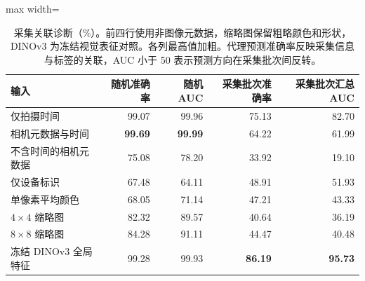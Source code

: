 \begin{table}[htbp]
\centering\small
\caption{采集关联诊断（\%）。前四行使用非图像元数据，缩略图保留粗略颜色和形状，DINOv3 为冻结视觉表征对照。各列最高值加粗。代理预测准确率反映采集信息与标签的关联，AUC 小于 50 表示预测方向在采集批次间反转。}
\label{tab:probes}
\begin{adjustbox}{max width=\linewidth}
\begin{tabular}{lrrrr}
\toprule
输入 & 随机准确率 & 随机 AUC & 采集批次准确率 & 采集批次汇总 AUC\\
\midrule
仅拍摄时间 & 99.07 & 99.96 & 75.13 & 82.70\\
相机元数据与时间 & \textbf{99.69} & \textbf{99.99} & 64.22 & 61.99\\
不含时间的相机元数据 & 75.08 & 78.20 & 33.92 & 19.10\\
仅设备标识 & 67.48 & 64.11 & 48.91 & 51.93\\
单像素平均颜色 & 68.05 & 71.14 & 47.21 & 43.33\\
$4\times4$ 缩略图 & 82.32 & 89.57 & 40.64 & 36.19\\
$8\times8$ 缩略图 & 84.28 & 91.11 & 44.47 & 40.48\\
冻结 DINOv3 全局特征 & 99.28 & 99.93 & \textbf{86.19} & \textbf{95.73}\\
\bottomrule
\end{tabular}
\end{adjustbox}
\end{table}
